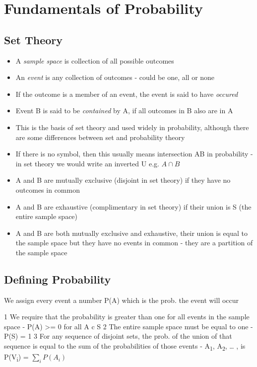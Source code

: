 \documentclass[]{book}
\theoremstyle{definition}
\theoremstyle{definition}
\theoremstyle{definition}
\theoremstyle{remark}
\begin{document}
\section{Fundamentals of Probability}\label{fundamentals-of-probability}

\subsection{Set Theory}\label{set-theory}

\begin{itemize}
\item
  A \emph{sample space} is collection of all possible outcomes
\item
  An \emph{event} is any collection of outcomes - could be one, all or
  none
\item
  If the outcome is a member of an event, the event is said to have
  \emph{occured}
\item
  Event B is said to be \emph{contained} by A, if all outcomes in B also
  are in A
\item
  This is the basis of set theory and used widely in probability,
  although there are some differences between set and probability theory
\item
  If there is no symbol, then this usually means intersection AB in
  probability - in set theory we would write an inverted U e.g.
  \(A \cap B\)
\item
  A and B are mutually exclusive (disjoint in set theory) if they have
  no outcomes in common
\item
  A and B are exhaustive (complimentary in set theory) if their union is
  S (the entire sample space)
\item
  A and B are both mutually exclusive and exhaustive, their union is
  equal to the sample space but they have no events in common - they are
  a partition of the sample space
\end{itemize}

\subsection{Defining Probability}\label{defining-probability}

We assign every event a number P(A) which is the prob. the event will
occur

1 We require that the probability is greater than one for all events in
the sample space - P(A) \textgreater{}= 0 for all A c S 2 The entire
sample space must be equal to one - P(S) = 1 3 For any sequence of
disjoint sets, the prob. of the union of that sequence is equal to the
sum of the probabilities of those events - A\textsubscript{1},
A\textsubscript{2}, \ldots{} , is P(V\textsubscript{i}) =
\(\sum_{i} P(A_i)\)
\end{document}
